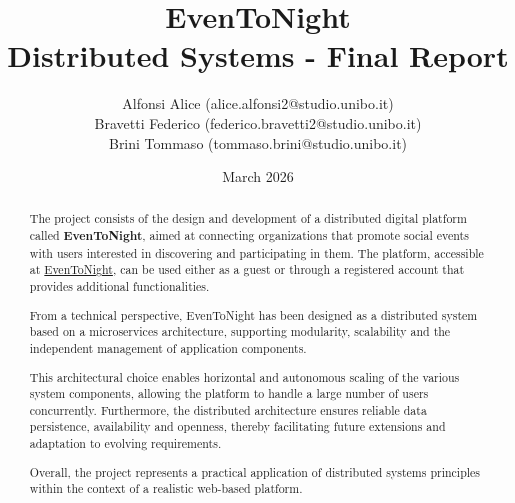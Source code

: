 \documentclass[a4paper,12pt]{article}
\title{\textbf{EvenToNight}\\
Distributed Systems - Final Report}
\author{
  Alfonsi Alice (alice.alfonsi2@studio.unibo.it)\\
  Bravetti Federico (federico.bravetti2@studio.unibo.it)\\
  Brini Tommaso (tommaso.brini@studio.unibo.it)
}
\date{March 2026}
\begin{document}
\maketitle

\begin{abstract}
The project consists of the design and development of a distributed digital platform called \textbf{EvenToNight}, aimed at connecting organizations that promote social events with users interested in discovering and participating in them. The platform, accessible at \href{https://eventonight.site/}{EvenToNight}, can be used either as a guest or through a registered account that provides additional functionalities.

From a technical perspective, EvenToNight has been designed as a distributed system based on a microservices architecture, supporting modularity, scalability and the independent management of application components.

This architectural choice enables horizontal and autonomous scaling of the various system components, allowing the platform to handle a large number of users concurrently. Furthermore, the distributed architecture ensures reliable data persistence, availability and openness, thereby facilitating future extensions and adaptation to evolving requirements.

Overall, the project represents a practical application of distributed systems principles within the context of a realistic web-based platform.
\end{abstract}

\tableofcontents
\newpage


\newpage

\newpage

\newpage

\newpage

\newpage

\newpage

\newpage

\newpage

\end{document}

